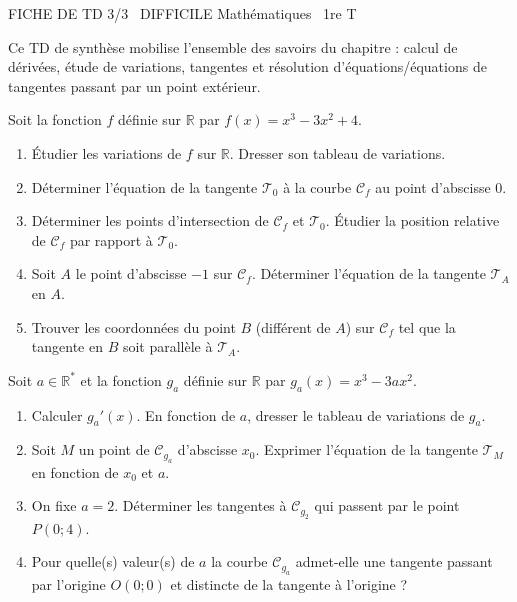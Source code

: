 \documentclass[11pt]{article}
\begin{document}
\begin{tcolorbox}[enhanced,colback=popink,colframe=popink,arc=10pt,boxrule=0pt,left=12pt,right=12pt,top=9pt,bottom=9pt]
{\color{white}\popxbold\small FICHE DE TD 3/3 \textbullet\ DIFFICILE \hfill Mathématiques \textbullet\ 1re T\par}
\end{tcolorbox}
\vspace{4pt}
Ce TD de synthèse mobilise l'ensemble des savoirs du chapitre : calcul de dérivées, étude de variations, tangentes et résolution d'équations/équations de tangentes passant par un point extérieur.

\begin{exercice}
Soit la fonction $f$ définie sur $\mathbb{R}$ par $f(x) = x^3 - 3x^2 + 4$.
\begin{enumerate}
    \item Étudier les variations de $f$ sur $\mathbb{R}$. Dresser son tableau de variations.
    \item Déterminer l'équation de la tangente $\mathcal{T}_0$ à la courbe $\mathcal{C}_f$ au point d'abscisse $0$.
    \item Déterminer les points d'intersection de $\mathcal{C}_f$ et $\mathcal{T}_0$. Étudier la position relative de $\mathcal{C}_f$ par rapport à $\mathcal{T}_0$.
    \item Soit $A$ le point d'abscisse $-1$ sur $\mathcal{C}_f$. Déterminer l'équation de la tangente $\mathcal{T}_A$ en $A$.
    \item Trouver les coordonnées du point $B$ (différent de $A$) sur $\mathcal{C}_f$ tel que la tangente en $B$ soit parallèle à $\mathcal{T}_A$.
\end{enumerate}
\end{exercice}

\begin{exercice}
Soit $a \in \mathbb{R}^*$ et la fonction $g_a$ définie sur $\mathbb{R}$ par $g_a(x) = x^3 - 3ax^2$.
\begin{enumerate}
    \item Calculer $g_a'(x)$. En fonction de $a$, dresser le tableau de variations de $g_a$.
    \item Soit $M$ un point de $\mathcal{C}_{g_a}$ d'abscisse $x_0$. Exprimer l'équation de la tangente $\mathcal{T}_M$ en fonction de $x_0$ et $a$.
    \item On fixe $a = 2$. Déterminer les tangentes à $\mathcal{C}_{g_2}$ qui passent par le point $P(0; 4)$.
    \item Pour quelle(s) valeur(s) de $a$ la courbe $\mathcal{C}_{g_a}$ admet-elle une tangente passant par l'origine $O(0;0)$ et distincte de la tangente à l'origine ?
\end{enumerate}
\end{exercice}
\end{document}
